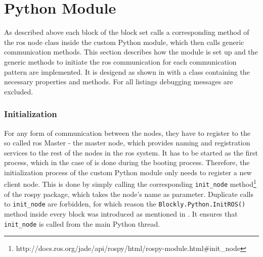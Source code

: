 \section{Python Module} \label{sec:PythonModule}
As described above each block of the \hobbit{} block set calls a corresponding method of the \gls{ros} node class inside the custom Python module, which then calls generic communication methods. This section describes how the module is set up and the generic methods to initiate the \gls{ros} communication for each communication pattern are implemented. It is desigend as shown in  with a class containing the necessary properties and methods. For all listings debugging messages are excluded.

\subsubsection{Initialization}
For any form of communication between the nodes, they have to register to the so called \gls{ros} Master - the master node, which provides naming and registration services to the rest of the nodes in the \gls{ros} system. It has to be started as the first process, which in the case of \hobbit{} is done during the booting process. Therefore, the initialization process of the custom Python module only needs to register a new client node. This is done by simply calling the corresponding \lstinline!init_node! method\footnote{http://docs.ros.org/jade/api/rospy/html/rospy-module.html\#init\_node} of the rospy package, which takes the node's name as parameter. Duplicate calls to \lstinline!init_node! are forbidden, for which reason the \lstinline!Blockly.Python.InitROS()! method inside every block was introduced as mentioned in . It ensures that \lstinline!init_node! is called from the main Python thread.

